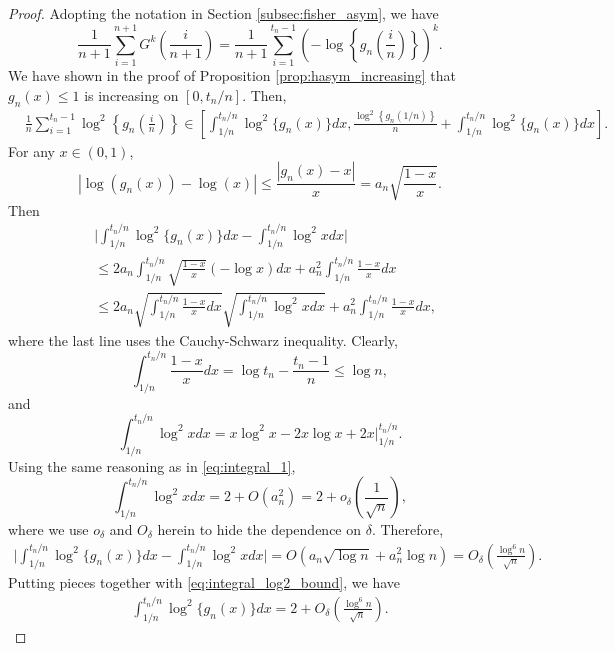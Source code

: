 \documentclass[11pt]{article}
\newcommand{\lb}{\left(}
\newcommand{\rb}{\right)}
\begin{document}
\begin{proof}
Adopting the notation in Section \ref{subsec:fisher_asym}, we have
  \[\frac{1}{n+1}\sum_{i=1}^{n+1}G^k\left(\frac{i}{n+1}\right) = \frac{1}{n+1}\sum_{i=1}^{t_n - 1} \lb -\log \left\{g_n\lb\frac{i}{n}\rb\right\}\rb^{k}.\]
  We have shown in the proof of Proposition \ref{prop:hasym_increasing} that $g_n(x)\le 1$ is increasing on $[0, t_n / n]$. Then,
  \begin{align}
    &\frac{1}{n}\sum_{i=1}^{t_n - 1} \log^2 \left\{g_n\lb\frac{i}{n}\rb\right\} \in \left[\int_{1/n}^{t_n / n}\log^2 \{g_n(x)\}dx, \frac{\log^2\left\{g_n(1 / n)\right\}}{n} + \int_{1/n}^{t_n / n}\log^2 \{g_n(x)\}dx\right].    \label{eq:integral_log2_bound}
  \end{align}
  For any $x\in (0, 1)$,
  \[|\log(g_n(x)) - \log(x)|\le \frac{|g_n(x) - x|}{x} = a_{n}\sqrt{\frac{1 - x}{x}}.\]
  Then
  \begin{align*}
    &\bigg|\int_{1/n}^{t_n / n}\log^2 \{g_n(x)\}dx - \int_{1/n}^{t_n / n}\log^2 xdx\bigg|\\
    & \le 2a_n \int_{1/n}^{t_n / n} \sqrt{\frac{1-x}{x}}(-\log x) dx + a_n^2 \int_{1/n}^{t_n / n} \frac{1-x}{x} dx\\
    & \le 2a_{n}\sqrt{\int_{1/n}^{t_n / n} \frac{1-x}{x} dx}\sqrt{\int_{1/n}^{t_n / n} \log^2 x dx} + a_n^2 \int_{1/n}^{t_n / n} \frac{1-x}{x} dx,
  \end{align*}
  where the last line uses the Cauchy-Schwarz inequality. Clearly,
  \[\int_{1/n}^{t_n / n} \frac{1-x}{x} dx = \log t_n - \frac{t_n - 1}{n}\le \log n,\]
  and
  \[\int_{1/n}^{t_n / n} \log^2 x dx = x\log^2 x - 2x\log x + 2x\bigg|_{1/n}^{t_n/n}.\]
  Using the same reasoning as in \eqref{eq:integral_1},
  \begin{equation}
    \label{eq:log2x_integral}
    \int_{1/n}^{t_n / n} \log^2 x dx = 2 + O(a_n^2) = 2 + o_{\delta}\lb\frac{1}{\sqrt{n}}\rb,
  \end{equation}
  where we use $o_{\delta}$ and $O_{\delta}$ herein to hide the dependence on $\delta$. Therefore,
  \begin{align*}
    \bigg|\int_{1/n}^{t_n / n}\log^2 \{g_n(x)\}dx - \int_{1/n}^{t_n / n}\log^2 xdx\bigg| = O(a_n \sqrt{\log n} + a_n^2\log n) = O_{\delta}\lb\frac{\log^6 n}{\sqrt{n}}\rb.
  \end{align*}
    Putting pieces together with \eqref{eq:integral_log2_bound}, we have
    \begin{align*}
   \int_{1/n}^{t_n / n}\log^2 \{g_n(x)\}dx = 2 + O_{\delta}\lb\frac{\log^6 n}{\sqrt{n}}\rb.

\end{align*}
\end{proof}
\end{document}
